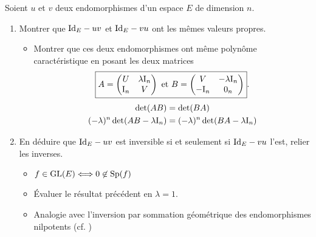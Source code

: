 Soient $u$ et $v$ deux endomorphismes d'un espace $E$ de dimension $n$.

\begin{enumerate}
    \item Montrer que $\mathrm{Id}_E-uv$ et $\mathrm{Id}_E-vu$ ont les mêmes valeurs propres.
    \begin{itemize}
        \item Montrer que ces deux endomorphismes ont même polynôme caractéristique en posant les deux matrices
        $$
        \boxed{
        A = 
        \begin{pmatrix}
            U & \lambda \mathrm{I}_n \\
            \mathrm{I}_n & V
        \end{pmatrix}
        \text{ et }
        B = 
        \begin{pmatrix}
            V & -\lambda \mathrm{I}_n \\
            -\mathrm{I}_n & 0_n
        \end{pmatrix}
        }.
        $$
        \begin{align*}
            \det(AB) &= \det(BA) \\
            (-\lambda)^n \det(AB - \lambda \mathrm{I}_n) &= (-\lambda)^n \det(BA - \lambda \mathrm{I}_n)
        \end{align*}
    \end{itemize}
    \item En déduire que $\mathrm{Id}_E-uv$ est inversible si et seulement si $\mathrm{Id}_E-vu$ l'est, relier les inverses. 
    \begin{itemize}
        \item $f \in \mathrm{GL}(E) \Longleftrightarrow 0 \not \in \mathrm{Sp}(f)$
        \item Évaluer le résultat précédent en $\lambda = 1$.
        \item Analogie avec l'inversion par sommation géométrique des endomorphismes nilpotents (cf. )
    \end{itemize}
\end{enumerate}